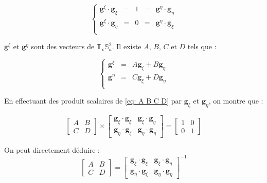 \begin{equation}
\left\lbrace
\begin{array}{rcccl}
\mathbf{g}^{\xi} \cdot \mathbf{g}_{\xi} & = & 1 & = & \mathbf{g}^{\eta} \cdot \mathbf{g}_{\eta} \\
\mathbf{g}^{\xi} \cdot \mathbf{g}_{\eta} & = & 0 & = & \mathbf{g}^{\eta} \cdot \mathbf{g}_{\xi} \\
\end{array}
\right.
\label{eq: normalisation g_xi g_eta}
\end{equation}

$\mathbf{g}^{\xi}$ et $\mathbf{g}^{\eta}$ sont des vecteurs de $\mathbb{T}_{\mathbf{x}}\mathbb{S}_a^2$. Il existe $A$, $B$, $C$ et $D$ tels que :

\begin{equation}
\left\lbrace
\begin{array}{rcl}
\mathbf{g}^{\xi} & = & A \mathbf{g}_{\xi} + B \mathbf{g}_{\eta} \\
\mathbf{g}^{\eta} & = & C \mathbf{g}_{\xi} + D \mathbf{g}_{\eta} \\
\end{array}
\right.
\label{eq: A B C D}
\end{equation}

En effectuant des produit scalaires de \eqref{eq: A B C D} par $\mathbf{g}_{\xi}$ et $\mathbf{g}_{\eta}$, on montre que :

\begin{equation}
\begin{bmatrix}
A & B \\ C &  D
\end{bmatrix}
\times
\begin{bmatrix}
\mathbf{g}_{\xi} \cdot \mathbf{g}_{\xi} & \mathbf{g}_{\xi} \cdot \mathbf{g}_{\eta} \\
\mathbf{g}_{\eta} \cdot \mathbf{g}_{\xi} & \mathbf{g}_{\eta} \cdot \mathbf{g}_{\eta}
\end{bmatrix}
= \begin{bmatrix}
1 & 0 \\ 0 &  1
\end{bmatrix}
\end{equation}

On peut directement déduire :
\begin{equation}
\begin{bmatrix}
A & B \\ C &  D
\end{bmatrix} 
=
\begin{bmatrix}
\mathbf{g}_{\xi} \cdot \mathbf{g}_{\xi} & \mathbf{g}_{\xi} \cdot \mathbf{g}_{\eta} \\
\mathbf{g}_{\eta} \cdot \mathbf{g}_{\xi} & \mathbf{g}_{\eta} \cdot \mathbf{g}_{\eta}
\end{bmatrix}^{-1}
\end{equation}


